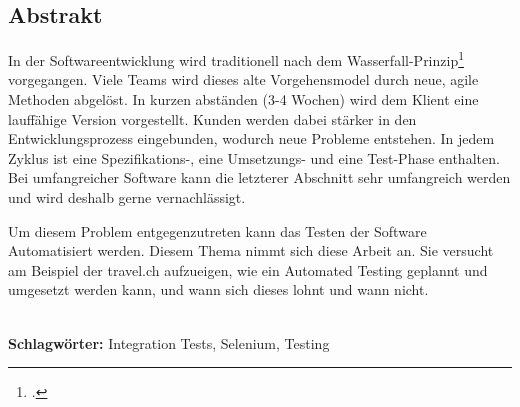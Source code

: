 
\subsection*{Abstrakt}
In der Softwareentwicklung wird traditionell nach dem Wasserfall-Prinzip\footcite{Wasserfallmodell} vorgegangen. Viele Teams wird dieses alte Vorgehensmodel durch neue, agile Methoden abgelöst. In kurzen abständen (3-4 Wochen) wird dem Klient eine lauffähige Version vorgestellt. Kunden werden dabei stärker in den Entwicklungsprozess eingebunden, wodurch neue Probleme entstehen. In jedem Zyklus ist eine Spezifikations-, eine Umsetzungs- und eine Test-Phase enthalten. Bei umfangreicher Software kann die letzterer Abschnitt sehr umfangreich werden und wird deshalb gerne vernachlässigt.

Um diesem Problem entgegenzutreten kann das Testen der Software Automatisiert werden. Diesem Thema nimmt sich diese Arbeit an. Sie versucht am Beispiel der travel.ch aufzueigen, wie ein Automated Testing geplannt und umgesetzt werden kann, und wann sich dieses lohnt und wann nicht.

%
\mbox{}\\[0.5\baselineskip]\noindent
\textbf{Schlagwörter:} 
Integration Tests, Selenium, Testing
